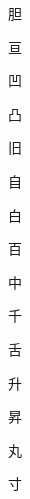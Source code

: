 \begin{spacing}{2.5}
{\Huge \begin{CJK}{UTF8}{min} 胆\end{CJK}}\hspace{0.1cm}
{\Huge \begin{CJK}{UTF8}{min} 亘\end{CJK}}\hspace{0.1cm}
{\Huge \begin{CJK}{UTF8}{min} 凹\end{CJK}}\hspace{0.1cm}
{\Huge \begin{CJK}{UTF8}{min} 凸\end{CJK}}\hspace{0.1cm}
{\Huge \begin{CJK}{UTF8}{min} 旧\end{CJK}}\hspace{0.1cm}
{\Huge \begin{CJK}{UTF8}{min} 自\end{CJK}}\hspace{0.1cm}
{\Huge \begin{CJK}{UTF8}{min} 白\end{CJK}}\hspace{0.1cm}
{\Huge \begin{CJK}{UTF8}{min} 百\end{CJK}}\hspace{0.1cm}
{\Huge \begin{CJK}{UTF8}{min} 中\end{CJK}}\hspace{0.1cm}
{\Huge \begin{CJK}{UTF8}{min} 千\end{CJK}}\hspace{0.1cm}
{\Huge \begin{CJK}{UTF8}{min} 舌\end{CJK}}\hspace{0.1cm}
{\Huge \begin{CJK}{UTF8}{min} 升\end{CJK}}\hspace{0.1cm}
{\Huge \begin{CJK}{UTF8}{min} 昇\end{CJK}}\hspace{0.1cm}
{\Huge \begin{CJK}{UTF8}{min} 丸\end{CJK}}\hspace{0.1cm}
{\Huge \begin{CJK}{UTF8}{min} 寸\end{CJK}}\hspace{0.1cm}

\end{spacing}
